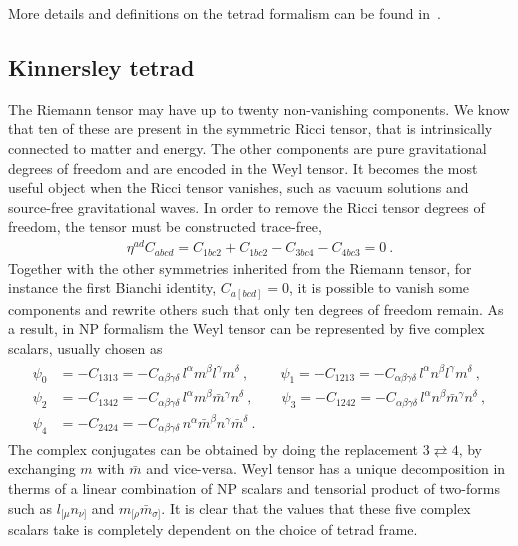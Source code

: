 More details and definitions on the tetrad formalism can be found in~.

\subsection{Kinnersley tetrad}

The Riemann tensor may have up to twenty non-vanishing components.
We know that ten of these are present in the symmetric Ricci tensor, that is intrinsically connected to matter and energy.
The other components are pure gravitational degrees of freedom and are encoded in the Weyl tensor.
It becomes the most useful object when the Ricci tensor vanishes, such as vacuum solutions and source-free gravitational waves.
In order to remove the Ricci tensor degrees of freedom, the tensor must be constructed trace-free,
\begin{align}
    \eta^{ad} C_{abcd} = C_{1bc2} + C_{1bc2} - C_{3bc4} - C_{4bc3} = 0 ~. 
\end{align}
Together with the other symmetries inherited from the Riemann tensor, for instance the first Bianchi identity, $C_{a[bcd]}=0$, it is possible to vanish some components and rewrite others such that only ten degrees of freedom remain.
As a result, in NP formalism the Weyl tensor can be represented by five complex scalars, usually chosen as
\begin{align}
    \begin{split}
        \psi_0 &= - C_{1313} = - C_{\alpha\beta\gamma\delta}\, l^\alpha m^\beta l^\gamma m^\delta ~,\qquad
        ~\psi_1 = - C_{1213} = - C_{\alpha\beta\gamma\delta}\, l^\alpha n^\beta l^\gamma m^\delta ~,\\
        \psi_2 &= - C_{1342} = - C_{\alpha\beta\gamma\delta}\, l^\alpha m^\beta \bar{m}^\gamma n^\delta ~,\qquad
        \psi_3 = - C_{1242} = - C_{\alpha\beta\gamma\delta}\, l^\alpha n^\beta \bar{m}^\gamma n^\delta ~,\\
        \psi_4 &= - C_{2424} = - C_{\alpha\beta\gamma\delta}\, n^\alpha \bar{m}^\beta n^\gamma \bar{m}^\delta ~.
    \end{split}
\end{align}
The complex conjugates can be obtained by doing the replacement $3 \rightleftarrows 4$, by exchanging $m$ with $\bar{m}$ and vice-versa. 
Weyl tensor has a unique decomposition in therms of a linear combination of NP scalars and tensorial product of two-forms such as $l_{[\mu} n_{\nu]}$ and $m_{[\rho} \bar{m}_{\sigma]}$. 
It is clear that the values that these five complex scalars take is completely dependent on the choice of tetrad frame. 

